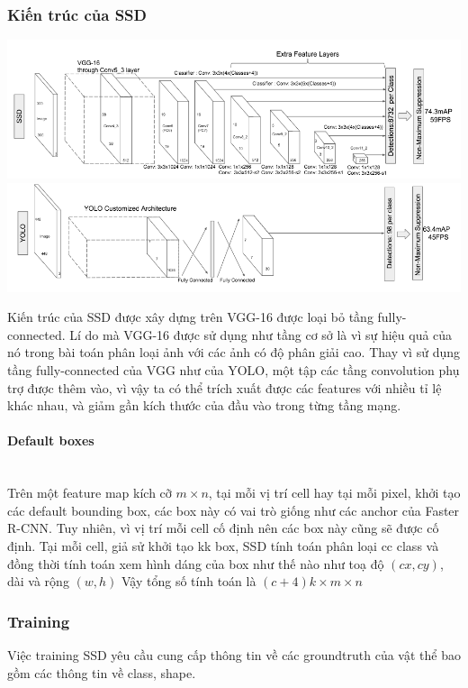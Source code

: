 \documentclass[a4paper,10pt]{article}
\begin{document}
\subsubsection{Kiến trúc của SSD}
\begin{center}
\includegraphics[scale=.5]{image/SSD2}
\includegraphics[scale=.5]{image/SSD3}
\end{center}
Kiến trúc của SSD được xây dựng trên VGG-16 được loại bỏ tầng fully-connected. Lí do mà VGG-16 được sử dụng như tầng cơ sở là vì sự hiệu quả của nó trong bài toán phân loại ảnh với các ảnh có độ phân giải cao. Thay vì sử dụng tầng fully-connected của VGG như của YOLO, một tập các tầng convolution phụ trợ được thêm vào, vì vậy ta có thể trích xuất được các features với nhiều tỉ lệ khác nhau, và giảm gần kích thước của đầu vào trong từng tầng mạng.
\paragraph{Default boxes}
\mbox{}\\Trên một feature map kích cỡ \( m \times n\), tại mỗi vị trí cell hay tại mỗi pixel, khởi tạo các default bounding box, các box này có vai trò giống như các anchor của Faster R-CNN. Tuy nhiên, vì vị trí mỗi cell cố định nên các box này cũng sẽ được cố định. Tại mỗi cell, giả sử khởi tạo kk box, SSD tính toán phân loại cc class và đồng thời tính toán xem hình dáng của box như thế nào như toạ độ \((cx,cy)\), dài và rộng \((w,h)\) Vậy tổng số tính toán là \((c+4) k \times m \times n \)
\subsubsection{Training}
Việc training SSD yêu cầu cung cấp thông tin về các groundtruth của vật thể bao gồm các thông tin về class, shape.
\end{document}
